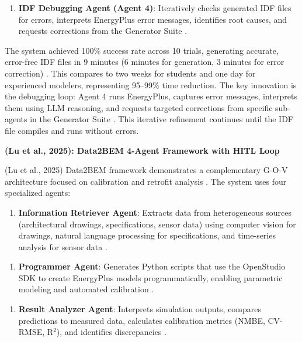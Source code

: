\documentclass[12pt,a4paper]{article}
\begin{document}
\begin{enumerate}
  \item \textbf{IDF Debugging Agent (Agent 4)}: Iteratively checks generated IDF files for errors, interprets EnergyPlus error messages, identifies root causes, and requests corrections from the Generator Suite \cite{ref130}.
\end{enumerate}

The system achieved 100\% success rate across 10 trials, generating accurate, error-free IDF files in 9 minutes (6 minutes for generation, 3 minutes for error correction) \cite{ref131}. This compares to two weeks for students and one day for experienced modelers, representing 95--99\% time reduction. The key innovation is the debugging loop: Agent 4 runs EnergyPlus, captures error messages, interprets them using LLM reasoning, and requests targeted corrections from specific sub-agents in the Generator Suite \cite{ref132}. This iterative refinement continues until the IDF file compiles and runs without errors.

\textbf{(Lu et al., 2025): Data2BEM 4-Agent Framework with HITL Loop}

(Lu et al., 2025) Data2BEM framework demonstrates a complementary G-O-V architecture focused on calibration and retrofit analysis \cite{ref133}. The system uses four specialized agents:

\begin{enumerate}
  \item \textbf{Information Retriever Agent}: Extracts data from heterogeneous sources (architectural drawings, specifications, sensor data) using computer vision for drawings, natural language processing for specifications, and time-series analysis for sensor data \cite{ref134}.
\end{enumerate}

\begin{enumerate}
  \item \textbf{Programmer Agent}: Generates Python scripts that use the OpenStudio SDK to create EnergyPlus models programmatically, enabling parametric modeling and automated calibration \cite{ref135}.
\end{enumerate}

\begin{enumerate}
  \item \textbf{Result Analyzer Agent}: Interprets simulation outputs, compares predictions to measured data, calculates calibration metrics (NMBE, CV-RMSE, R$^2$), and identifies discrepancies \cite{ref136}.
\end{enumerate}
\end{document}
